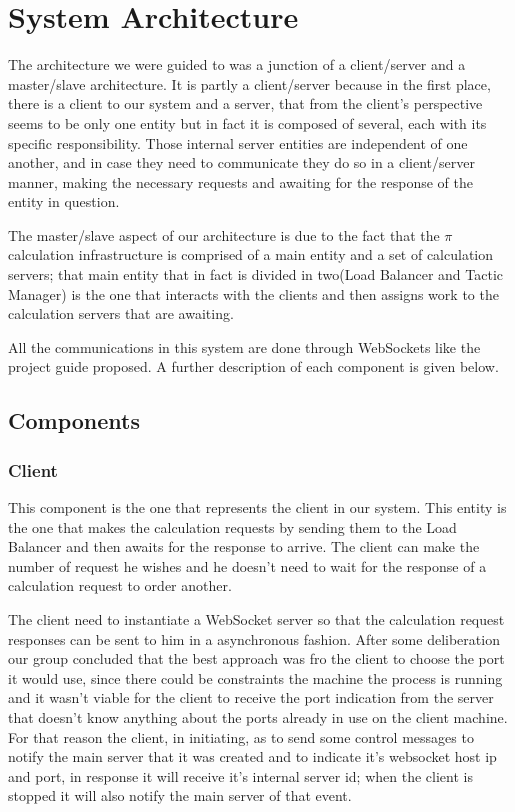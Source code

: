 \documentclass[12pt]{article}
\begin{document}
\newpage
\section{System Architecture} \label{architecture} %
The architecture we were guided to was a junction of a client/server and a master/slave architecture. It is partly a client/server because in the first place, there is a client to our system and a server, that from the client's perspective seems to be only one entity but in fact it is composed of several, each with its specific responsibility. Those internal server entities are independent of one another, and in case they need to communicate they do so in a client/server manner, making the necessary requests and awaiting for the response of the entity in question.

The master/slave aspect of our architecture is due to the fact that the $\pi$ calculation infrastructure is comprised of a main entity and a set of calculation servers; that main entity that in fact is divided in two(Load Balancer and Tactic Manager) is the one that interacts with the clients and then assigns work to the calculation servers that are awaiting.

All the communications in this system are done through WebSockets like the project guide proposed. A further description of each component is given below.


\subsection{Components} \label{components} %

\subsubsection{Client}
This component is the one that represents the client in our system. This entity is the one that makes the calculation requests by sending them to the Load Balancer and then awaits for the response to arrive. The client can make the number of request he wishes and he doesn't need to wait for the response of a calculation request to order another.

The client need to instantiate a WebSocket server so that the calculation request responses can be sent to him in a asynchronous fashion. After some deliberation our group concluded that the best approach was fro the client to choose the port it would use, since there could be constraints the machine the process is running and it wasn't viable for the client to receive the port indication from the server that doesn't know anything about the ports already in use on the client machine. For that reason the client, in initiating, as to send some control messages to notify the main server that it was created and to indicate it's websocket host ip and port, in response it will receive it's internal server id; when the client is stopped it will also notify the main server of that event.
\end{document}
